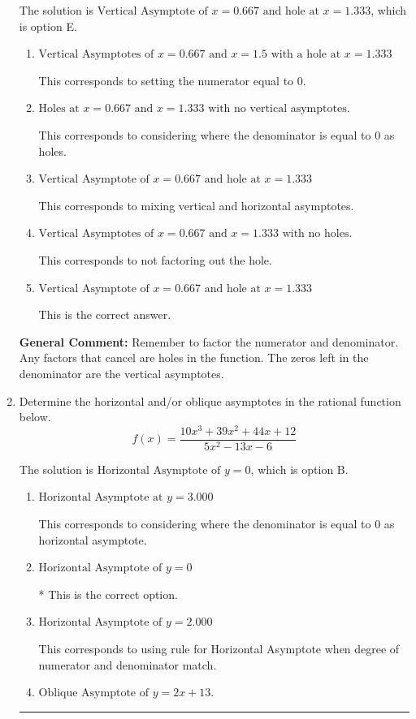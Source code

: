 \documentclass{extbook}[14pt]
\newcommand{\litem}[1]{\item #1

\rule{\textwidth}{0.4pt}}
\begin{document}
\begin{enumerate}
{The solution is \( \text{Vertical Asymptote of } x = 0.667 \text{ and hole at } x = 1.333 \), which is option E.\begin{enumerate}[label=\Alph*.]
\item \( \text{Vertical Asymptotes of } x = 0.667 \text{ and } x = 1.5 \text{ with a hole at } x = 1.333 \)

This corresponds to setting the numerator equal to 0.
\item \( \text{Holes at } x = 0.667 \text{ and } x = 1.333 \text{ with no vertical asymptotes.} \)

This corresponds to considering where the denominator is equal to 0 as holes.
\item \( \text{Vertical Asymptote of } x = 0.667 \text{ and hole at } x = 1.333 \)

This corresponds to mixing vertical and horizontal asymptotes.
\item \( \text{Vertical Asymptotes of } x = 0.667 \text{ and } x = 1.333 \text{ with no holes.} \)

This corresponds to not factoring out the hole.
\item \( \text{Vertical Asymptote of } x = 0.667 \text{ and hole at } x = 1.333 \)

This is the correct answer.
\end{enumerate}

\textbf{General Comment:} Remember to factor the numerator and denominator. Any factors that cancel are holes in the function. The zeros left in the denominator are the vertical asymptotes.
}
\litem{
Determine the horizontal and/or oblique asymptotes in the rational function below.
\[ f(x) = \frac{10x^{3} +39 x^{2} +44 x + 12}{5x^{2} -13 x -6} \]

The solution is \( \text{Horizontal Asymptote of } y = 0 \), which is option B.\begin{enumerate}[label=\Alph*.]
\item \( \text{Horizontal Asymptote at } y = 3.000 \)

This corresponds to considering where the denominator is equal to 0 as horizontal asymptote.
\item \( \text{Horizontal Asymptote of } y = 0 \)

* This is the correct option.
\item \( \text{Horizontal Asymptote of } y = 2.000  \)

This corresponds to using rule for Horizontal Asymptote when degree of numerator and denominator match.
\item \( \text{Oblique Asymptote of } y = 2x + 13. \)


\end{enumerate}}
\end{enumerate}
\end{document}
